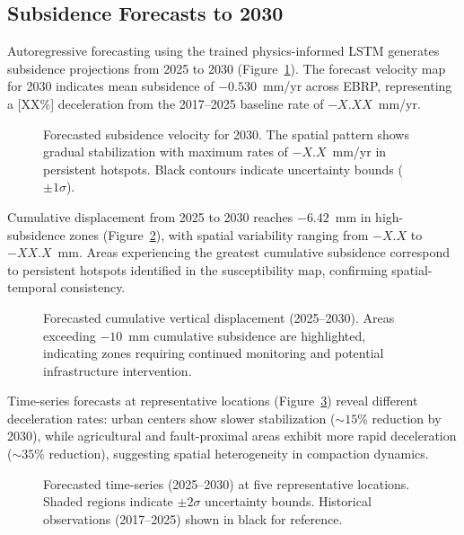 \subsection{Subsidence Forecasts to 2030}

Autoregressive forecasting using the trained physics-informed LSTM generates subsidence projections from 2025 to 2030 (Figure~\ref{fig:forecast_maps}). The forecast velocity map for 2030 indicates mean subsidence of $-0.530$~mm/yr across EBRP, representing a [XX\%] deceleration from the 2017--2025 baseline rate of $-X.XX$~mm/yr.

\begin{figure}[!t]
\centering
\caption{Forecasted subsidence velocity for 2030. The spatial pattern shows gradual stabilization with maximum rates of $-X.X$~mm/yr in persistent hotspots. Black contours indicate uncertainty bounds ($\pm 1\sigma$).}
\label{fig:forecast_maps}
\end{figure}

Cumulative displacement from 2025 to 2030 reaches $-6.42$~mm in high-subsidence zones (Figure~\ref{fig:cumulative_displacement}), with spatial variability ranging from $-X.X$ to $-XX.X$~mm. Areas experiencing the greatest cumulative subsidence correspond to persistent hotspots identified in the susceptibility map, confirming spatial-temporal consistency.

\begin{figure}[!t]
\centering
\caption{Forecasted cumulative vertical displacement (2025--2030). Areas exceeding $-10$~mm cumulative subsidence are highlighted, indicating zones requiring continued monitoring and potential infrastructure intervention.}
\label{fig:cumulative_displacement}
\end{figure}

Time-series forecasts at representative locations (Figure~\ref{fig:forecast_timeseries}) reveal different deceleration rates: urban centers show slower stabilization ($\sim 15$\% reduction by 2030), while agricultural and fault-proximal areas exhibit more rapid deceleration ($\sim 35$\% reduction), suggesting spatial heterogeneity in compaction dynamics.

\begin{figure}[!t]
\centering
\caption{Forecasted time-series (2025--2030) at five representative locations. Shaded regions indicate $\pm 2\sigma$ uncertainty bounds. Historical observations (2017--2025) shown in black for reference.}
\label{fig:forecast_timeseries}
\end{figure}

